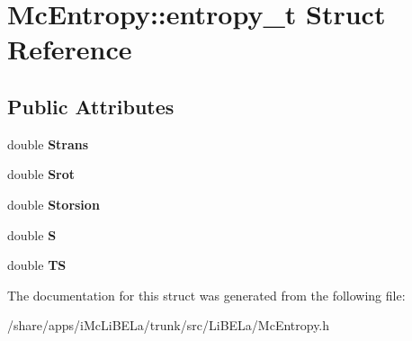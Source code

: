 \hypertarget{structMcEntropy_1_1entropy__t}{
\section{McEntropy::entropy\_\-t Struct Reference}
\label{structMcEntropy_1_1entropy__t}
}
\subsection*{Public Attributes}
\begin{DoxyCompactItemize}
\item 
\hypertarget{structMcEntropy_1_1entropy__t_a79e3d7d7cb146cc426c813b91a5a3385}{
double {\bfseries Strans}}
\label{structMcEntropy_1_1entropy__t_a79e3d7d7cb146cc426c813b91a5a3385}

\item 
\hypertarget{structMcEntropy_1_1entropy__t_a272c5cdbfd21455a7e53476bf37a6bba}{
double {\bfseries Srot}}
\label{structMcEntropy_1_1entropy__t_a272c5cdbfd21455a7e53476bf37a6bba}

\item 
\hypertarget{structMcEntropy_1_1entropy__t_a60b115123f7e95601a82c2ea13242b79}{
double {\bfseries Storsion}}
\label{structMcEntropy_1_1entropy__t_a60b115123f7e95601a82c2ea13242b79}

\item 
\hypertarget{structMcEntropy_1_1entropy__t_a8e934908c363868cfcff87757ddf50cf}{
double {\bfseries S}}
\label{structMcEntropy_1_1entropy__t_a8e934908c363868cfcff87757ddf50cf}

\item 
\hypertarget{structMcEntropy_1_1entropy__t_ab19392fe97dbe15315e7383a1ad81e85}{
double {\bfseries TS}}
\label{structMcEntropy_1_1entropy__t_ab19392fe97dbe15315e7383a1ad81e85}

\end{DoxyCompactItemize}


The documentation for this struct was generated from the following file:\begin{DoxyCompactItemize}
\item 
/share/apps/iMcLiBELa/trunk/src/LiBELa/McEntropy.h\end{DoxyCompactItemize}
